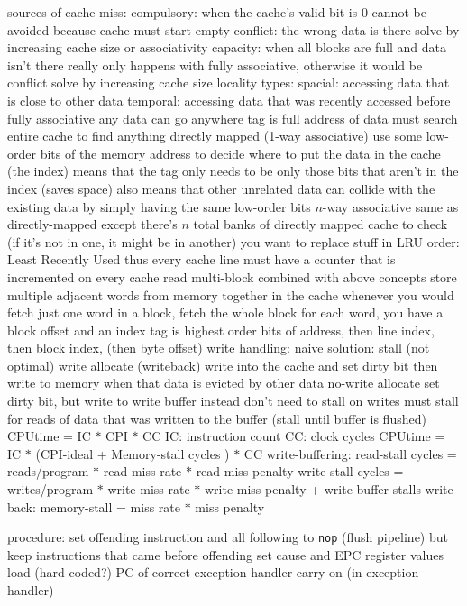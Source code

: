 \documentclass[12pt]{article}
\begin{document}
\begin{spacing}{0.8}
\begin{multicols*}{2}
\begin{flushleft}
\begin{outline}[longenum]
  \1 sources of cache miss:
    \2 compulsory: when the cache's valid bit is $0$
      \3 cannot be avoided because cache must start empty
    \2 conflict: the wrong data is there
      \3 solve by increasing cache size or associativity
    \2 capacity: when all blocks are full and data isn't there
      \3 really only happens with fully associative, otherwise it would be conflict
      \3 solve by increasing cache size
  \1 locality types:
    \2 spacial: accessing data that is close to other data 
    \2 temporal: accessing data that was recently accessed before
  \1 fully associative
    \2 any data can go anywhere
    \2 tag is full address of data
    \2 must search entire cache to find anything
  \1 directly mapped (1-way associative)
    \2 use some low-order bits of the memory address to decide where to put the data in the cache (the index)
    \2 means that the tag only needs to be only those bits that aren't in the index (saves space)
    \2 also means that other unrelated data can collide with the existing data by simply having the same low-order bits
  \1 $n$-way associative
    \2 same as directly-mapped except there's $n$ total banks of directly mapped cache to check
    \2 (if it's not in one, it might be in another)
    \2 you want to replace stuff in LRU order: Least Recently Used
      \3 thus every cache line must have a counter that is incremented on every cache read
  \1 multi-block
    \2 combined with above concepts
    \2 store multiple adjacent words from memory together in the cache
    \2 whenever you would fetch just one word in a block, fetch the whole block
    \2 for each word, you have a block offset and an index
    \2 tag is highest order bits of address, then line index, then block index, (then byte offset)
  \1 write handling:
    \2 naive solution: stall (not optimal) 
    \2 write allocate (writeback)
      \3 write into the cache and set dirty bit
      \3 then write to memory when that data is evicted by other data
    \2 no-write allocate
      \3 set dirty bit, but write to write buffer instead
      \3 don't need to stall on writes
      \3 must stall for reads of data that was written to the buffer
        (stall until buffer is flushed)
  \1 CPUtime = IC $*$ CPI $*$ CC
    \2 IC: instruction count
    \2 CC: clock cycles
  \1 CPUtime = IC $*$ (CPI-ideal + Memory-stall cycles ) $*$ CC
  \1 write-buffering: 
    \2 read-stall cycles = reads/program $*$ read miss rate $*$ read miss penalty
    \2 write-stall cycles = writes/program $*$ write miss rate $*$ write miss penalty + write buffer stalls
  \1 write-back: memory-stall = miss rate $*$ miss penalty

  \1 procedure:
    \2 set offending instruction and all following to \verb|nop|
      (flush pipeline)
      \3 but keep instructions that came before offending
    \2 set cause and EPC register values
    \2 load (hard-coded?) PC of correct exception handler
    \2 carry on (in exception handler)

\end{outline}
\end{flushleft}
\end{multicols*}
\end{spacing}
\end{document}
